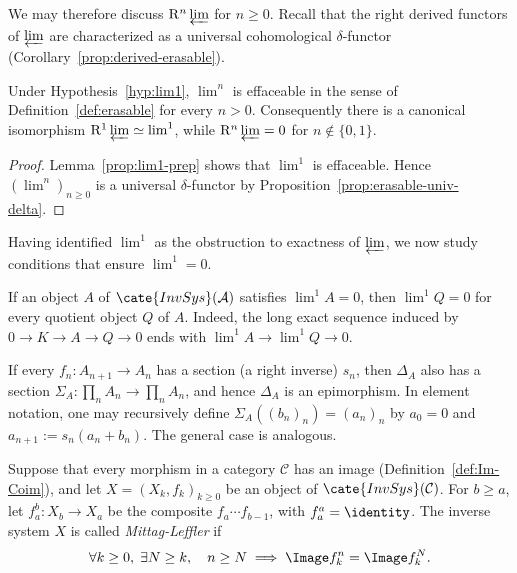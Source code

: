 We may therefore discuss $\mathrm{R}^n\varprojlim$ for $n\geq0$. Recall that
the right derived functors of $\varprojlim$ are characterized as a universal
cohomological $\delta$-functor (Corollary~\ref{prop:derived-erasable}).

\begin{theorem}[S.\ Eilenberg]\label{prop:lim1}
	Under Hypothesis~\ref{hyp:lim1}, $\lim\nolimits^n$ is effaceable in the
sense of Definition~\ref{def:erasable} for every $n>0$. Consequently there
is a canonical isomorphism
$\mathrm{R}^1\varprojlim\simeq\lim^1$, while
$\mathrm{R}^n\varprojlim=0$ for $n\notin\{0,1\}$.
\end{theorem}
\begin{proof}
	Lemma~\ref{prop:lim1-prep} shows that $\lim^1$ is effaceable. Hence
	$(\lim^n)_{n\geq0}$ is a universal $\delta$-functor by
	Proposition~\ref{prop:erasable-univ-delta}.
\end{proof}

Having identified $\lim^1$ as the obstruction to exactness of $\varprojlim$,
we now study conditions that ensure $\lim^1=0$.

\begin{example}\label{eg:quotient-lim1-0}
	If an object $A$ of $\cate{InvSys}(\mathcal{A})$ satisfies $\lim^1A=0$,
	then $\lim^1Q=0$ for every quotient object $Q$ of $A$. Indeed, the long exact
	sequence induced by $0\to K\to A\to Q\to0$ ends with
	$\lim^1A\to\lim^1Q\to0$.
\end{example}

\begin{example}\label{eg:lim1-section}
	If every $f_n:A_{n+1}\to A_n$ has a section (a right inverse) $s_n$, then
	$\Delta_A$ also has a section
	$\Sigma_A:\prod_nA_n\to\prod_nA_n$, and hence $\Delta_A$ is an
	epimorphism. In element notation, one may recursively define
	$\Sigma_A((b_n)_n)=(a_n)_n$ by $a_0=0$ and
	$a_{n+1}:=s_n(a_n+b_n)$. The general case is analogous.
\end{example}

\begin{definition}\label{def:ML}
	Suppose that every morphism in a category $\mathcal{C}$ has an image
	(Definition~\ref{def:Im-Coim}), and let
	$X=(X_k,f_k)_{k\geq0}$ be an object of $\cate{InvSys}(\mathcal{C})$.
	For $b\geq a$, let $f_a^b:X_b\to X_a$ be the composite
	$f_a\cdots f_{b-1}$, with $f_a^a=\identity$. The inverse system $X$ is
	called \emph{Mittag-Leffler} if
	\[ \forall k \geq 0, \; \exists N \geq k, \quad n \geq N \implies \Image f^n_k = \Image f^N_k. \]
\end{definition}

